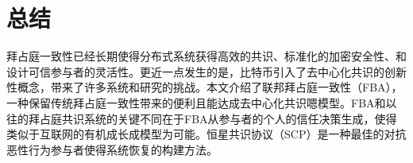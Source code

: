 \section{总结}

拜占庭一致性已经长期使得分布式系统获得高效的共识、标准化的加密安全性、和设计可信参与者的灵活性。更近一点发生的是，比特币引入了去中心化共识的创新性概念，带来了许多系统和研究的挑战。本文介绍了联邦拜占庭一致性（FBA），一种保留传统拜占庭一致性带来的便利且能达成去中心化共识嗯模型。FBA和以往的拜占庭共识系统的关键不同在于FBA从参与者的个人的信任决策生成{\quorum}，使得类似于互联网的有机成长成模型为可能。恒星共识协议（SCP）是一种最佳的对抗恶性行为参与者使得系统恢复的构建方法。